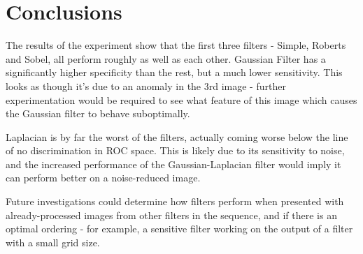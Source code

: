 \documentclass[12pt]{article}
\begin{document}
  \section{Conclusions}
  The results of the experiment show that the first three filters - Simple, Roberts and Sobel, all perform roughly as well as each other. Gaussian Filter has a significantly higher specificity than the rest, but a much lower sensitivity. This looks as though it's due to an anomaly in the 3rd image - further experimentation would be required to see what feature of this image which causes the Gaussian filter to behave suboptimally.

  Laplacian is by far the worst of the filters, actually coming worse below the line of no discrimination in ROC space. This is likely due to its sensitivity to noise, and the increased performance of the Gaussian-Laplacian filter would imply it can perform better on a noise-reduced image.

  Future investigations could determine how filters perform when presented with already-processed images from other filters in the sequence, and if there is an optimal ordering - for example, a sensitive filter working on the output of a filter with a small grid size.
\end{document}
